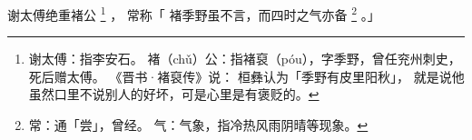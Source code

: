 
\switchcolumn*[\section{}]

谢太傅绝重褚公%
\footnote{%
    谢太傅：指李安石。
    褚（chǔ）公：指褚裒（póu），字季野，曾任兖州刺史，死后赠太傅。
            《晋书·褚裒传》说：
            桓彝认为「季野有皮里阳秋」，
            就是说他虽然口里不说别人的好坏，可是心里是有褒贬的。
}%
，
常称「
    褚季野虽不言，而四时之气亦备%
    \footnote{%
        常：通「尝」，曾经。
        气：气象，指冷热风雨阴晴等现象。
    }%
。」

\switchcolumn



